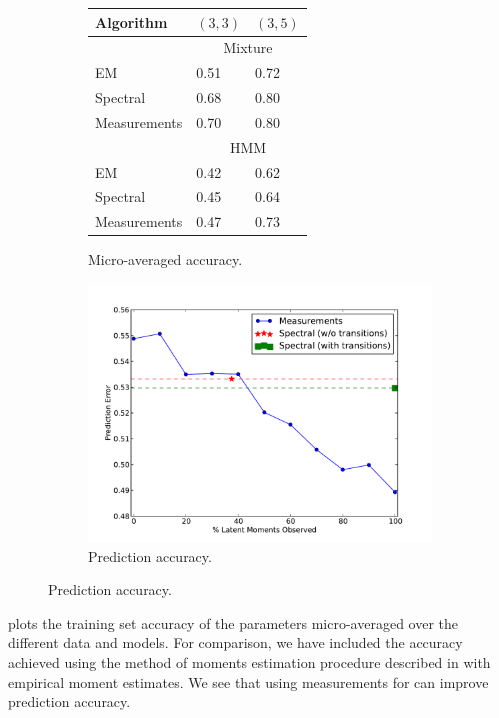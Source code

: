 \begin{figure}
  \centering
  \begin{subfigure}[b]{0.4\textwidth}
    \begin{tabular}{l | l l }
        Algorithm & $(3,3)$ & $(3,5)$ \\ \hline
        & \multicolumn{2}{c}{Mixture} \\
        EM                    & 0.51 & 0.72 \\
        Spectral              & 0.68 & 0.80 \\
        Measurements  & 0.70 & 0.80 \\
        & \multicolumn{2}{c}{HMM} \\
        EM                    & 0.42 & 0.62  \\
        Spectral              & 0.45 & 0.64  \\
        Measurements  & 0.47 & 0.73
    \end{tabular}
    \caption{Micro-averaged accuracy.}
    \label{tab:errors}
  \end{subfigure}
  \begin{subfigure}[b]{0.4\textwidth}
    \includegraphics[width=1.0\textwidth]{figures/measurements.pdf}
    \caption{Prediction accuracy.}
    \label{fig:measurements}
  \end{subfigure}
\end{figure}

 plots the training set accuracy of the parameters
micro-averaged over the different data and models.  For comparison, we have
included the accuracy achieved using the method of moments estimation procedure
described in  with empirical moment estimates.  We see
that using measurements for can improve prediction accuracy. 

